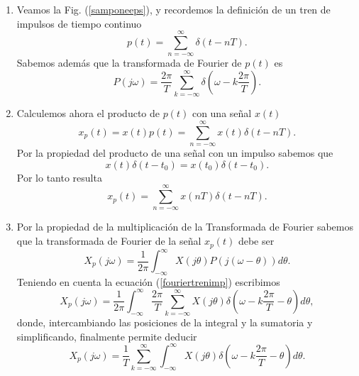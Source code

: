 \begin{enumerate}
\item Veamos la Fig. (\ref{samponeeps}), y recordemos la definici\'{o}n de un tren de impulsos de tiempo 
continuo
\begin{equation}
        p\left( t\right) =\sum_{n=-\infty }^{\infty }\delta \left( t-nT\right) .        \label{samptemp}
\end{equation}
Sabemos adem\'{a}s que la transformada de Fourier de $p(t)$ es
\begin{equation}
        P\left( j\omega \right) =
                \frac{2\pi }{T}\sum_{k=-\infty }^{\infty }\delta\left( \omega -k\frac{2\pi }{T}\right) .
                \label{fouriertrenimp}
\end{equation}

\item Calculemos ahora el producto de $p\left( t\right) $ con una se\~{n}al $x\left( t\right) $
\begin{equation}
        x_{p}\left( t\right) = x\left( t\right) p\left( t\right) = 
                  \sum_{n=-\infty }^{\infty } x(t) \delta \left( t-nT\right).
\end{equation}
Por la propiedad del producto de una se\~{n}al con un impulso sabemos que
\begin{equation}
        x\left( t\right) \delta \left( t-t_{0}\right) =x\left( t_{0}\right) \delta \left( t-t_{0}\right) .
\end{equation}
Por lo tanto resulta 
\begin{equation}
        x_{p}\left( t\right) =\sum_{n=-\infty }^{\infty }x\left( nT\right) \delta \left( t-nT\right) .
\end{equation}

\item Por la propiedad de la multiplicaci\'{o}n de la Transformada de Fourier
sabemos que la transformada de Fourier de la se\~{n}al $x_{p}(t)$ debe ser
\begin{equation}
        X_{p}\left( j\omega \right) =
                \frac{1}{2\pi }
                \int_{-\infty }^{\infty}
                        X\left( j\theta \right) P\left( j\left( \omega -\theta \right) \right) d\theta .
\end{equation}
Teniendo en cuenta la ecuaci\'{o}n (\ref{fouriertrenimp}) escribimos
\begin{equation}
        X_{p}\left( j\omega \right) =
\frac{1}{2\pi }
\int_{-\infty }^{\infty}
  \frac{2\pi }{T}
  \sum_{k=-\infty }^{\infty }    
      X\left( j\theta \right) \delta\left( \omega -k\frac{2\pi}{T} -\theta \right)  
d\theta,
\end{equation}
donde, intercambiando las posiciones de la integral y la sumatoria y simplificando, finalmente 
permite deducir
\begin{equation}
        X_{p}\left( j\omega \right) =
  \frac{1}{T}
  \sum_{k=-\infty }^{\infty }
  \int_{-\infty }^{\infty}
      X\left( j\theta \right) \delta\left( \omega -k\frac{2\pi}{T} -\theta \right)  
  d\theta.
\end{equation}


\end{enumerate}
